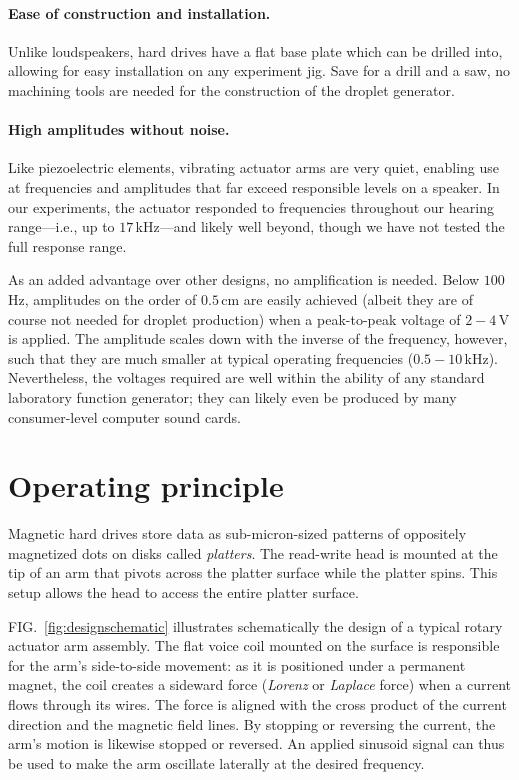\documentclass[aip,rsi,reprint,graphicx]{revtex4-1} %
\begin{document}
\paragraph*{Ease of construction and installation.} Unlike loudspeakers, hard
drives have a flat base plate which can be drilled into, allowing for easy
installation on any experiment jig. Save for a drill and a saw, no machining
tools are needed for the construction of the droplet generator.

\paragraph*{High amplitudes without noise.}
Like piezoelectric elements, vibrating actuator arms are very quiet, enabling
use at frequencies and amplitudes that far exceed responsible levels on
a speaker.  In our experiments, the actuator responded to frequencies throughout
our hearing range---i.e., up to $17\,$kHz---and likely well beyond, though we
have not tested the full response range.

As an added advantage over other designs, no amplification is needed. Below
$100\,$Hz, amplitudes on the order of $0.5\,$cm are easily achieved (albeit they
are of course not needed for droplet production) when a peak-to-peak voltage of
$2-4\,$V is applied. The amplitude scales down with the inverse of the frequency,
however, such that they are much smaller at typical operating frequencies
($0.5-10\,$kHz). Nevertheless, the voltages required are well within the ability
of any standard laboratory function generator; they can likely even be produced by many
consumer-level computer sound cards.

\section{Operating principle}
Magnetic hard drives store data as sub-micron-sized patterns of 
oppositely magnetized dots on disks called \emph{platters}. The read-write head
is mounted at the tip of an arm that pivots across the platter surface while the
platter spins. This setup allows the head to access the entire platter surface.

FIG.~\ref{fig:designschematic} illustrates schematically the design of a typical
rotary actuator arm assembly. The flat voice coil mounted on the surface is responsible
for the arm's side-to-side movement: as it is positioned under a permanent
magnet, the coil creates a sideward force (\emph{Lorenz} or \emph{Laplace}
force) when a current flows through its wires. The force is aligned with the
cross product of the current direction and the magnetic field lines. By stopping
or reversing the current, the arm's motion is likewise stopped or reversed. An
applied sinusoid signal can thus be used to make the arm oscillate laterally at
the desired frequency.
\end{document}
